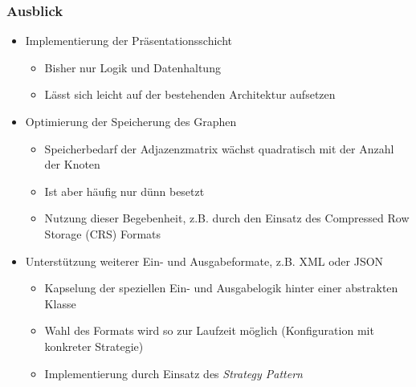 \documentclass[ngerman, t]{beamer}
\begin{document}
\begin{frame}
  \frametitle{Ausblick}
  \begin{itemize}
    \item Implementierung der Pr\"asentationsschicht
      \begin{itemize}
        \item Bisher nur Logik und Datenhaltung
        \item L\"asst sich leicht auf der bestehenden Architektur
          aufsetzen
      \end{itemize}
    \item Optimierung der Speicherung des Graphen
      \begin{itemize}
        \item Speicherbedarf der Adjazenzmatrix w\"achst quadratisch
          mit der Anzahl der Knoten
        \item Ist aber h\"aufig nur d\"unn besetzt
        \item Nutzung dieser Begebenheit, z.B. durch den Einsatz des
          Compressed Row Storage (CRS) Formats
      \end{itemize}
    \item Unterst\"utzung weiterer Ein- und Ausgabeformate, z.B. XML
      oder JSON
      \begin{itemize}
        \item Kapselung der speziellen Ein- und Ausgabelogik hinter
          einer abstrakten Klasse
        \item Wahl des Formats wird so zur Laufzeit m\"oglich
          (Konfiguration mit konkreter Strategie)
        \item Implementierung durch Einsatz des \textit{Strategy Pattern}
      \end{itemize}
  \end{itemize}
\end{frame}

\begin{frame}

\end{frame}
\end{document}
